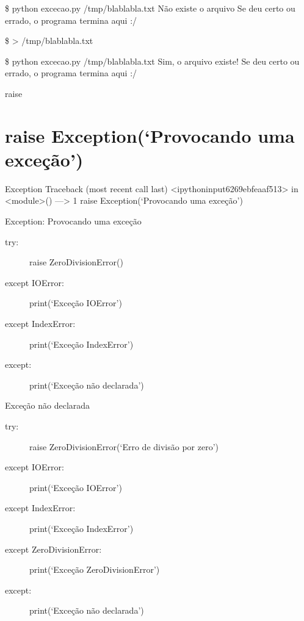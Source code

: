 \documentclass[letterpaper,10pt,brazil]{sphinxmanual}
\begin{document}
\$ python excecao.py /tmp/blablabla.txt
Não existe o arquivo
Se deu certo ou errado, o programa termina aqui :/

\$ \textgreater{} /tmp/blablabla.txt

\$ python excecao.py /tmp/blablabla.txt
Sim, o arquivo existe!
Se deu certo ou errado, o programa termina aqui :/

raise


\chapter{raise Exception(‘Provocando uma exceção’)}
\label{\detokenize{content/except:raise-exception-provocando-uma-excecao}}
Exception                                 Traceback (most recent call last)
\textless{}ipython\sphinxhyphen{}input\sphinxhyphen{}62\sphinxhyphen{}69ebfeaaf513\textgreater{} in \textless{}module\textgreater{}()
—\sphinxhyphen{}\textgreater{} 1 raise Exception(‘Provocando uma exceção’)

Exception: Provocando uma exceção
\begin{description}
\item[{try:}] \leavevmode
raise ZeroDivisionError()

\item[{except IOError:}] \leavevmode
print(‘Exceção IOError’)

\item[{except IndexError:}] \leavevmode
print(‘Exceção IndexError’)

\item[{except:}] \leavevmode
print(‘Exceção não declarada’)

\end{description}

Exceção não declarada
\begin{description}
\item[{try:}] \leavevmode
raise ZeroDivisionError(‘Erro de divisão por zero’)

\item[{except IOError:}] \leavevmode
print(‘Exceção IOError’)

\item[{except IndexError:}] \leavevmode
print(‘Exceção IndexError’)

\item[{except ZeroDivisionError:}] \leavevmode
print(‘Exceção ZeroDivisionError’)

\item[{except:}] \leavevmode
print(‘Exceção não declarada’)

\end{description}
\end{document}
